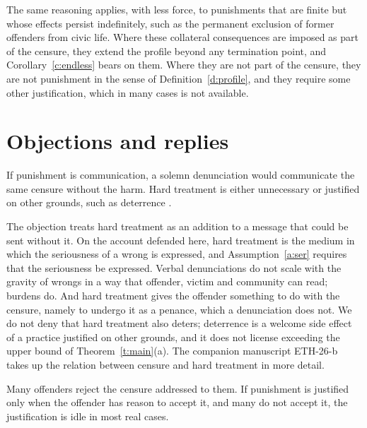 \documentclass{situationist-preprint}
\begin{document}
The same reasoning applies, with less force, to punishments that are finite but whose effects persist indefinitely, such as the permanent exclusion of former offenders from civic life. Where these collateral consequences are imposed as part of the censure, they extend the profile beyond any termination point, and Corollary~\ref{c:endless} bears on them. Where they are not part of the censure, they are not punishment in the sense of Definition~\ref{d:profile}, and they require some other justification, which in many cases is not available.

\section{Objections and replies}

\begin{objection}\label{o:hard}
If punishment is communication, a solemn denunciation would communicate the same censure without the harm. Hard treatment is either unnecessary or justified on other grounds, such as deterrence \citep{vonHirsch1993}.
\end{objection}

\begin{reply}
The objection treats hard treatment as an addition to a message that could be sent without it. On the account defended here, hard treatment is the medium in which the seriousness of a wrong is expressed, and Assumption~\ref{a:ser} requires that the seriousness be expressed. Verbal denunciations do not scale with the gravity of wrongs in a way that offender, victim and community can read; burdens do. And hard treatment gives the offender something to do with the censure, namely to undergo it as a penance, which a denunciation does not. We do not deny that hard treatment also deters; deterrence is a welcome side effect of a practice justified on other grounds, and it does not license exceeding the upper bound of Theorem~\ref{t:main}(a). The companion manuscript ETH-26-b takes up the relation between censure and hard treatment in more detail.
\end{reply}

\begin{objection}\label{o:unrep}
Many offenders reject the censure addressed to them. If punishment is justified only when the offender has reason to accept it, and many do not accept it, the justification is idle in most real cases.
\end{objection}
\end{document}

